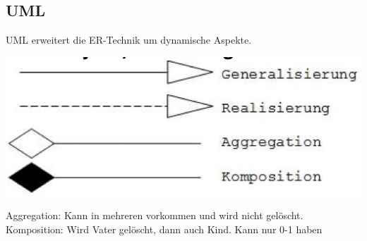 \documentclass[10pt,landscape,a4paper]{scrartcl}
\begin{document}
\begin{multicols*}{5}
\section{UML}
\textcolor{b}{UML} erweitert die ER-Technik um dynamische Aspekte.
	\vspace{-8pt}
\begin{center}
	\includegraphics[scale=.4]{Graphic/UML}
\end{center}
	\vspace{-8pt}
\textcolor{b}{Aggregation:} Kann in mehreren vorkommen und wird nicht gelöscht.\\
\textcolor{b}{Komposition:} Wird Vater gelöscht, dann auch Kind. Kann nur 0-1 haben

\vspace{-8pt}

\end{multicols*}
\end{document}
